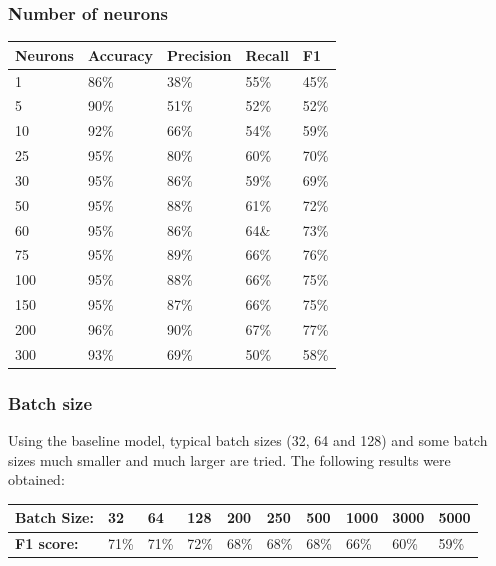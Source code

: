 \documentclass[
	a4paper,
	pagesize,
	pdftex,
	12pt,
	twoside, %
	BCOR=5mm, %
	ngerman,
	fleqn,
	final,
	]{scrartcl}
\begin{document}
\subsubsection{Number of neurons}



\begin{tabular}{ | p{2cm} || p{2cm}|p{2cm}|p{2cm}|p{2cm}|  }
	\hline
	Neurons & Accuracy & Precision & Recall & F1 \\
	\hline
	1 & 86\% & 38\% & 55\% & 45\% \\
	5 & 90\% &  51\% &  52\% &  52\% \\
	10 & 92\% &  66\% &  54\% &  59\% \\
	25 & 95\% &  80\% &  60\% &  70\% \\
	30 & 95\% &  86\% &  59\% &  69\% \\
	50 & 95\% &  88\% &  61\% &  72\% \\
	60 & 95\% &  86\% &  64\& &  73\%\\
	75 & 95\% &  89\% &  66\% &  76\% \\
	100 & 95\% &  88\% &  66\% &  75\% \\
	150 & 95\% &  87\% &  66\% &  75\% \\
	200 & 96\% &  90\% &  67\% &  77\% \\
	300 & 93\% & 69\% & 50\% & 58\%\\ 
	\hline
	\hline
\end{tabular}


\subsubsection{Batch size}

Using the baseline model, typical batch sizes (32, 64 and 128) and some batch sizes much smaller and much larger are tried. The following results were obtained: 

\begin{tabular} { | p{3cm} || p{0.8cm} | p{0.8cm}  | p{0.8cm}  |p{0.8cm} | p{0.8cm} | p{0.8cm} | p{0.8cm} | p{0.8cm}| p{0.8cm} |}
	\hline
	\textbf{Batch Size:}  &  32 & 64 & 128 & 200 & 250 & 500 & 1000 & 3000 &5000\\   
	\hline
	\textbf{F1 score:} & 71\% & 71\% & 72\% & 68\% & 68\% & 68\% & 66\% & 60\% & 59\%\\
	\hline
	\hline
\end{tabular}
\end{document}

